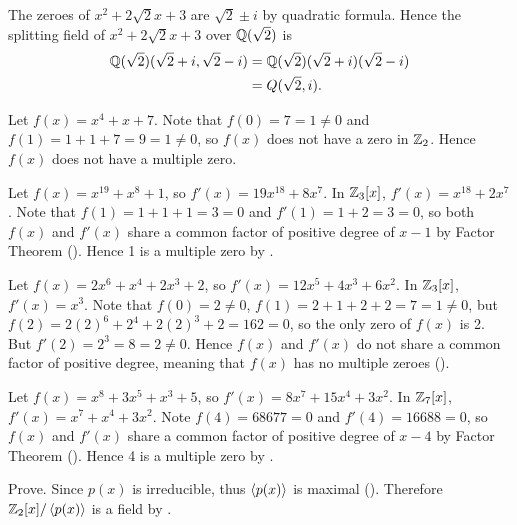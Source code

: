 \begin{questions}
\begin{partquestions}{\alph*}
        \item The zeroes of $x^2 + 2\sqrt2x + 3$ are $\sqrt2 \pm i$ by quadratic formula. Hence the splitting field of $x^2 + 2\sqrt2x + 3$ over $\mathbb{Q}(\sqrt2)$ is
        \begin{align*}
            \mathbb{Q}(\sqrt2)(\sqrt2+i, \sqrt2-i) &= \mathbb{Q}(\sqrt2)(\sqrt2 + i)(\sqrt2 - i)\\
            &= Q(\sqrt2, i).
        \end{align*}
    \end{partquestions}
    
    \item \begin{partquestions}{\alph*}
        \item Let $f(x) = x^4 + x + 7$. Note that $f(0) = 7 = 1 \neq 0$ and $f(1) = 1 + 1 + 7 = 9 = 1 \neq 0$, so $f(x)$ does not have a zero in $\mathbb{Z}_2$. Hence $f(x)$ does not have a multiple zero.
        
        \item Let $f(x) = x^{19} + x^8 + 1$, so $f'(x) = 19x^{18} + 8x^7$. In $\mathbb{Z}_3[x]$, $f'(x) = x^{18} + 2x^7$. Note that $f(1) = 1 + 1 + 1 = 3 = 0$ and $f'(1) = 1 + 2 = 3 = 0$, so both $f(x)$ and $f'(x)$ share a common factor of positive degree of $x-1$ by Factor Theorem (). Hence 1 is a multiple zero by .
        
        \item Let $f(x) = 2x^6 + x^4 + 2x^3 + 2$, so $f'(x) = 12x^5 + 4x^3 + 6x^2$. In $\mathbb{Z}_3[x]$, $f'(x) = x^3$. Note that $f(0) = 2 \neq 0$, $f(1) = 2 + 1 + 2 + 2 = 7 = 1 \neq 0$, but $f(2) = 2(2)^6 + 2^4 + 2(2)^3 + 2 = 162 = 0$, so the only zero of $f(x)$ is 2. But $f'(2) = 2^3 = 8 = 2 \neq 0$. Hence $f(x)$ and $f'(x)$ do not share a common factor of positive degree, meaning that $f(x)$ has no multiple zeroes ().
        
        \item Let $f(x) = x^8 + 3x^5 + x^3 + 5$, so $f'(x) = 8x^7 + 15x^4 + 3x^2$. In $\mathbb{Z}_7[x]$, $f'(x) = x^7 + x^4 + 3x^2$. Note $f(4) = 68677 = 0$ and $f'(4) = 16688 = 0$, so $f(x)$ and $f'(x)$ share a common factor of positive degree of $x-4$ by Factor Theorem (). Hence 4 is a multiple zero by .
    \end{partquestions}
    
    \item \begin{partquestions}{\roman*}
        \item Prove. Since $p(x)$ is irreducible, thus $\left\langle p(x)\right\rangle$ is maximal (). Therefore $\mathbb{Z}_2[x]/\left\langle p(x)\right\rangle$ is a field by .
        

\end{partquestions}
\end{questions}
